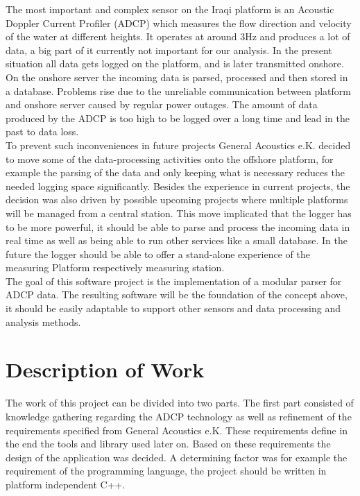 The most important and complex sensor on the Iraqi platform is an Acoustic Doppler Current Profiler (ADCP) which measures the flow direction and velocity of the water at different heights. It operates at around 3Hz and produces a lot of data, a big part of it currently not important for our analysis. In the present situation all data gets logged on the platform, and is later transmitted onshore. On the onshore server the incoming data is parsed, processed and then stored in a database. Problems rise due to the unreliable communication between platform and onshore server caused by regular power outages. The amount of data produced by the ADCP is too high to be logged over a long time and lead in the past to data loss.\\\newline
To prevent such inconveniences in future projects General Acoustics e.K. decided to move some of the data-processing activities onto the offshore platform, for example the parsing of the data and only keeping what is necessary reduces the needed logging space significantly. Besides the experience in current projects, the decision was also driven by possible upcoming projects where multiple platforms will be managed from a central station. This move implicated that the logger has to be more powerful, it should be able to parse and process the incoming data in real time as well as being able to run other services like a small database. In the future the logger should be able to offer a stand-alone experience of the measuring Platform respectively measuring station.\\\newline
The goal of this software project is the implementation of a modular parser for ADCP data. The resulting software will be the foundation of the concept above, it should be easily adaptable to support other sensors and data processing and analysis methods. 

\section{Description of Work}
The work of this project can be divided into two parts. The first part consisted of knowledge gathering regarding the ADCP technology as well as refinement of the requirements specified from General Acoustics e.K. These requirements define in the end the tools and library used later on. Based on these requirements the design of the application was decided. A determining factor was for example the requirement of the programming language, the project should be written in platform independent C++. %

